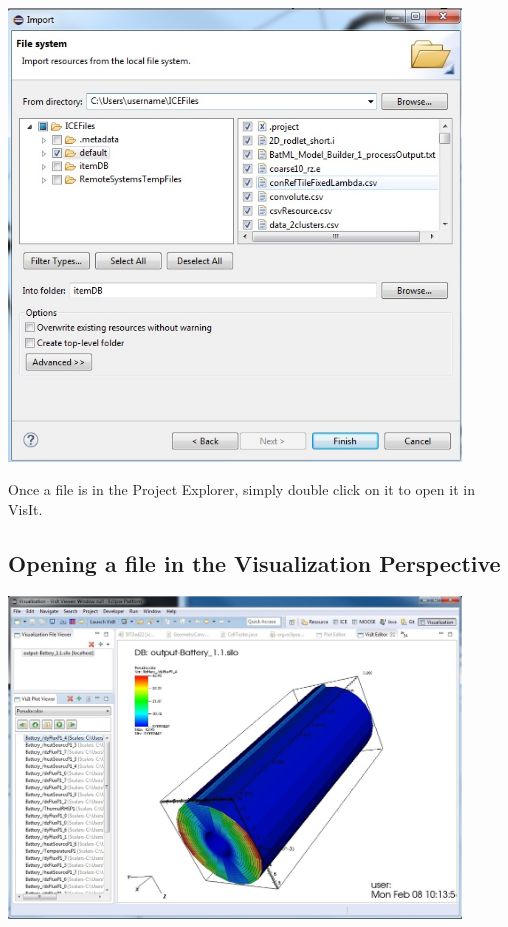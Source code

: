 \begin{center}
\includegraphics[width=12cm]{images/ImportFileDialog}
\end{center}

Once a file is in the Project Explorer, simply double click on it to open it in
VisIt.

\subsection{Opening a file in the Visualization Perspective}

\begin{center}
\includegraphics[width=12cm]{images/VisualizationPerspectiveOverview}
\end{center}

